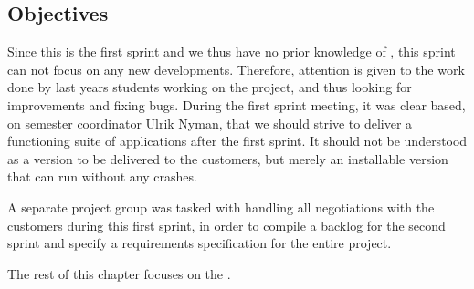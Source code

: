 \subsection{Objectives}\label{sec:sprint1:objectives}
Since this is the first sprint and we thus have no prior knowledge of \giraf, this sprint can not focus on any new developments.
Therefore, attention is given to the work done by last years students working on the project, and thus looking for improvements and fixing bugs.
During the first sprint meeting, it was clear based, on semester coordinator Ulrik Nyman, that we should strive to deliver a functioning suite of applications after the first sprint.
It should not be understood as a version to be delivered to the customers, but merely an installable version that can run without any crashes. 

A separate project group was tasked with handling all negotiations with the customers during this first sprint, in order to compile a backlog for the second sprint and specify a requirements specification for the entire project.

The rest of this chapter focuses on the \launcher.









